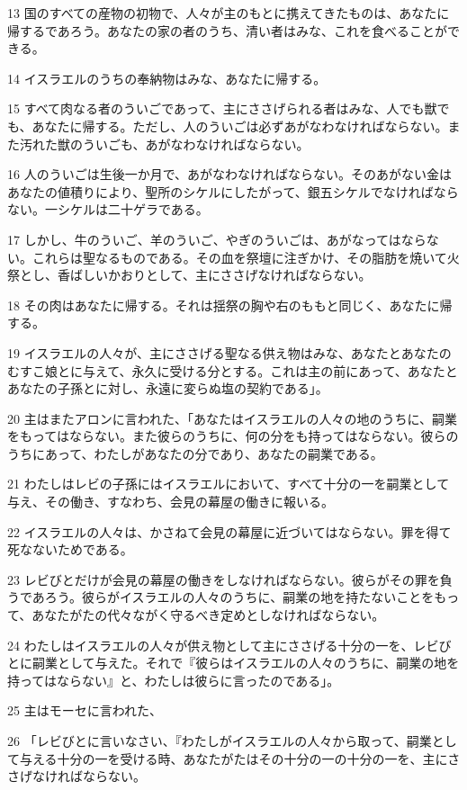 \par 13 国のすべての産物の初物で、人々が主のもとに携えてきたものは、あなたに帰するであろう。あなたの家の者のうち、清い者はみな、これを食べることができる。
\par 14 イスラエルのうちの奉納物はみな、あなたに帰する。
\par 15 すべて肉なる者のういごであって、主にささげられる者はみな、人でも獣でも、あなたに帰する。ただし、人のういごは必ずあがなわなければならない。また汚れた獣のういごも、あがなわなければならない。
\par 16 人のういごは生後一か月で、あがなわなければならない。そのあがない金はあなたの値積りにより、聖所のシケルにしたがって、銀五シケルでなければならない。一シケルは二十ゲラである。
\par 17 しかし、牛のういご、羊のういご、やぎのういごは、あがなってはならない。これらは聖なるものである。その血を祭壇に注ぎかけ、その脂肪を焼いて火祭とし、香ばしいかおりとして、主にささげなければならない。
\par 18 その肉はあなたに帰する。それは揺祭の胸や右のももと同じく、あなたに帰する。
\par 19 イスラエルの人々が、主にささげる聖なる供え物はみな、あなたとあなたのむすこ娘とに与えて、永久に受ける分とする。これは主の前にあって、あなたとあなたの子孫とに対し、永遠に変らぬ塩の契約である」。
\par 20 主はまたアロンに言われた、「あなたはイスラエルの人々の地のうちに、嗣業をもってはならない。また彼らのうちに、何の分をも持ってはならない。彼らのうちにあって、わたしがあなたの分であり、あなたの嗣業である。
\par 21 わたしはレビの子孫にはイスラエルにおいて、すべて十分の一を嗣業として与え、その働き、すなわち、会見の幕屋の働きに報いる。
\par 22 イスラエルの人々は、かさねて会見の幕屋に近づいてはならない。罪を得て死なないためである。
\par 23 レビびとだけが会見の幕屋の働きをしなければならない。彼らがその罪を負うであろう。彼らがイスラエルの人々のうちに、嗣業の地を持たないことをもって、あなたがたの代々ながく守るべき定めとしなければならない。
\par 24 わたしはイスラエルの人々が供え物として主にささげる十分の一を、レビびとに嗣業として与えた。それで『彼らはイスラエルの人々のうちに、嗣業の地を持ってはならない』と、わたしは彼らに言ったのである」。
\par 25 主はモーセに言われた、
\par 26 「レビびとに言いなさい、『わたしがイスラエルの人々から取って、嗣業として与える十分の一を受ける時、あなたがたはその十分の一の十分の一を、主にささげなければならない。
